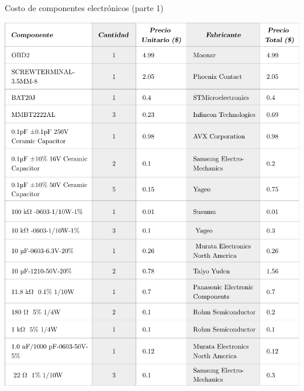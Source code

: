 \begin{table}[htbp!]
  \centering
  \caption{Costo de componentes electrónicos (parte 1)}
  \label{diag:costos_elec_1}
  \includegraphics[width=0.9\linewidth]{BOM_1.pdf}
\end{table}


